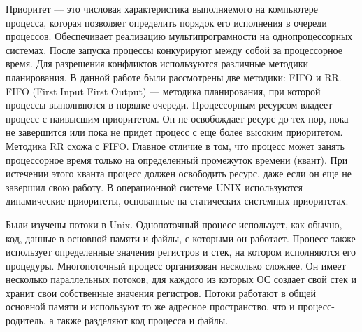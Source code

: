 \documentclass[a4paper]{article}
\begin{document}
	 Приоритет --- это числовая характеристика выполняемого на компьютере процесса, которая позволяет определить порядок его исполнения в очереди процессов. Обеспечивает реализацию мультипрограмности на однопроцессорных системах. После запуска процессы конкурируют между собой за процессорное время. Для разрешения конфликтов используются различные методики планирования. В данной работе были рассмотрены две методики: FIFO и RR. FIFO (First Input First Output) --- методика планирования, при которой процессы выполняются в порядке очереди. Процессорным ресурсом владеет процесс с наивысшим приоритетом. Он не освобождает ресурс до тех пор, пока не завершится или пока не придет процесс с еще более высоким приоритетом. Методика RR схожа с FIFO. Главное отличие в том, что процесс может занять процессорное время только на определенный промежуток времени (квант). При истечении этого кванта процесс должен освободить ресурс, даже если он еще не завершил свою работу. В операционной системе UNIX используются динамические приоритеты, основанные на статических системных приоритетах. 
	 	
	Были изучены потоки в Unix. Однопоточный процесс использует, как обычно, код, данные в основной памяти и файлы, с которыми он работает. Процесс также использует определенные значения регистров и стек, на котором исполняются его процедуры. Многопоточный процесс организован несколько сложнее. Он имеет несколько параллельных потоков, для каждого из которых ОС создает свой стек и хранит свои собственные значения регистров. Потоки работают в общей основной памяти и используют то же адресное пространство, что и процесс-родитель, а также разделяют код процесса и файлы. 
\end{document}
